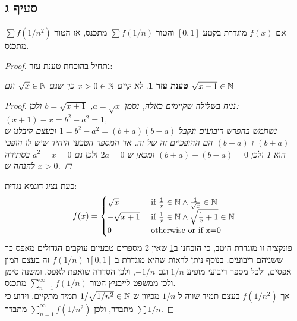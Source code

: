 \documentclass{article}
\newtheorem{lemma}[theorem]{טענת עזר}
\begin{document}
		\subsection*{סעיף ג}
		אם $f(x)$ מוגדרת בקטע $[0,1]$ והטור $\sum f(1/n)$ מתכנס, אז הטור $\sum f(1/n^2)$ מתכנס.
		\begin{proof}
			נתחיל בהוכחת טענת עזר:
			\begin{lemma}\label{lemma:1}
				לא קיים $x > 0 \in \mathbb{N}$ כך שגם $\sqrt{x} \in \mathbb{N}$ וגם $\sqrt{x+1} \in \mathbb{N}$
				\begin{proof}
					נניח בשלילה שקיימים כאלה, נסמן $a = \sqrt{x}$, $b = \sqrt{x+1}$
					ולכן: $(x+1) - x = b^2 - a^2 = 1$, \\
					 נשתמש בהפרש ריבועים ונקבל $1 = b^2 - a^2 = (b+a)(b-a)$
					 ובעצם קיבלנו ש $(b+a)$ ו $(b-a)$ הם ההופכיים זה של זה. אך המספר הטבעי היחיד שיש לו הופכי הוא 1 ולכן
					 $(b+a) - (b-a) = 0$ ומכאן ש $2a = 0$ ולכן גם $a^2=x=0$ בסתירה להנחה ש $x>0$.
				\end{proof}
			\end{lemma}

			כעת נציג דוגמא נגדית:
			\begin{align*}
				f(x) = \begin{cases}
					\sqrt{x} &\text{ if } \frac{1}{x} \in \mathbb{N} \land \frac{1}{\sqrt{x}} \in \mathbb{N} \\
					-\sqrt{x+1} &\text{ if } \frac{1}{x} \in \mathbb{N} \land \sqrt{\frac{1}{x}+1} \in \mathbb{N} \\
					0 &\text{ otherwise or if x=0 } \\
				\end{cases}
			\end{align*}
			פונקציה זו מוגדרת היטב, כי הוכחנו ב\ref{lemma:1} שאין 2 מספרים טבעיים עוקבים הגדולים מאפס כך ששניהם ריבועים.
			בנוסף ניתן לראות שהיא מוגדרת ב $[0,1]$ו $f(1/n)$ זה בעצם המון אפסים, ולכל מספר ריבועי מופיע $1/n$ וגם $-1/n$,
			 ולכן הסדרה שואפת לאפס, ומשנה סימן ולכן ממשפט לייבניץ הטור $\sum_{n=1}^\infty f(1/n)$ מתכנס. \\
			אך $f(1/n^2)$ בעצם תמיד שווה ל $1/n$ מכיוון ש $1/\sqrt{1/n^2} \in \mathbb{N}$ תמיד מתקיים. וידוע כי $\sum 1/n$ מתבדר, ולכן $\sum_{n=1}^\infty f(1/n^2)$ מתבדר.
		\end{proof}
\end{document}
